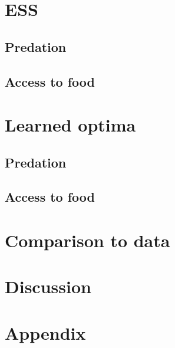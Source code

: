 \documentclass{article}
\begin{document}
\section{ESS }
\subsection{Predation }

\subsection{Access to food }

\section{Learned optima }

\subsection{Predation }

\subsection{Access to food }
\section{Comparison to data}

\section{Discussion}

\section{Appendix}
\end{document}
